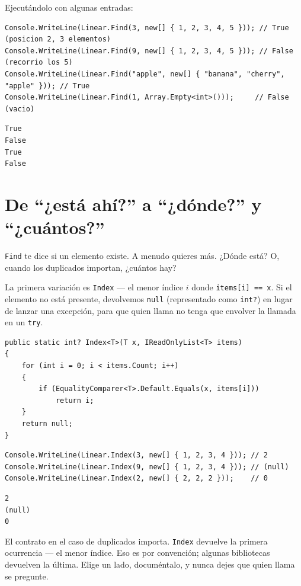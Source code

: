 \documentclass[11pt,a4paper]{article}
\begin{document}
Ejecutándolo con algunas entradas:

\begin{lstlisting}
Console.WriteLine(Linear.Find(3, new[] { 1, 2, 3, 4, 5 })); // True  (posicion 2, 3 elementos)
Console.WriteLine(Linear.Find(9, new[] { 1, 2, 3, 4, 5 })); // False (recorrio los 5)
Console.WriteLine(Linear.Find("apple", new[] { "banana", "cherry", "apple" })); // True
Console.WriteLine(Linear.Find(1, Array.Empty<int>()));     // False (vacio)
\end{lstlisting}

\begin{verbatim}
True
False
True
False
\end{verbatim}

\section{De \texorpdfstring{``¿está ahí?''}{'¿está ahí?'} a \texorpdfstring{``¿dónde?''}{'¿dónde?'} y \texorpdfstring{``¿cuántos?''}{'¿cuántos?'}}

\texttt{Find} te dice si un elemento existe. A menudo quieres más. ¿Dónde está? O, cuando los duplicados importan, ¿cuántos hay?

La primera variación es \texttt{Index} --- el menor índice $i$ donde \texttt{items[i] == x}. Si el elemento no está presente, devolvemos \texttt{null} (representado como \texttt{int?}) en lugar de lanzar una excepción, para que quien llama no tenga que envolver la llamada en un \texttt{try}.

\begin{lstlisting}[caption={\texttt{Index}: primera ocurrencia}]
public static int? Index<T>(T x, IReadOnlyList<T> items)
{
    for (int i = 0; i < items.Count; i++)
    {
        if (EqualityComparer<T>.Default.Equals(x, items[i]))
            return i;
    }
    return null;
}
\end{lstlisting}

\begin{lstlisting}
Console.WriteLine(Linear.Index(3, new[] { 1, 2, 3, 4 })); // 2
Console.WriteLine(Linear.Index(9, new[] { 1, 2, 3, 4 })); // (null)
Console.WriteLine(Linear.Index(2, new[] { 2, 2, 2 }));    // 0
\end{lstlisting}

\begin{verbatim}
2
(null)
0
\end{verbatim}

El contrato en el caso de duplicados importa. \texttt{Index} devuelve la primera ocurrencia --- el menor índice. Eso es por convención; algunas bibliotecas devuelven la última. Elige un lado, documéntalo, y nunca dejes que quien llama se pregunte.
\end{document}
